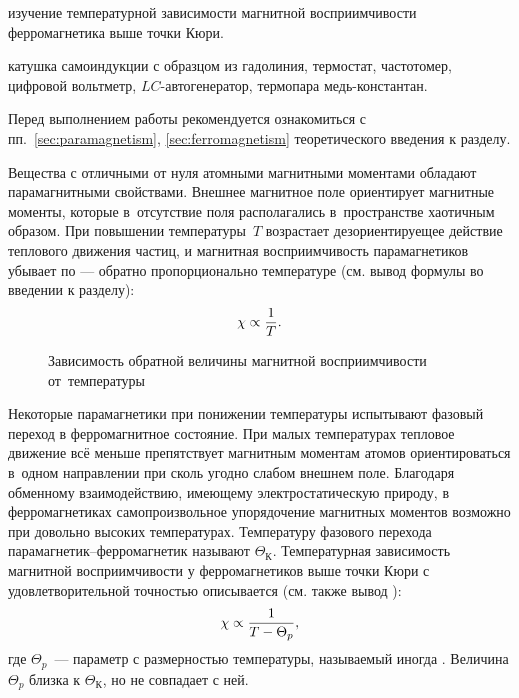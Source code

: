 
\begin{lab:aim}
изучение температурной зависимости магнитной восприимчивости ферромагнетика
выше точки Кюри.
\end{lab:aim}

\begin{lab:equipment}
катушка самоиндукции с образцом из гадолиния, термостат, частотомер,
цифровой вольтметр, $LC$-автогенератор, термопара медь-константан.
\end{lab:equipment}

Перед выполнением работы рекомендуется ознакомиться с
пп.~\ref{sec:paramagnetism}, \ref{sec:ferromagnetism} теоретического
введения к разделу.

Вещества с отличными от нуля атомными магнитными моментами обладают
парамагнитными свойствами. Внешнее магнитное поле ориентирует магнитные моменты,
которые в~отсутствие поля располагались в~пространстве хаотичным образом.
При повышении температуры~$T$ возрастает дезориентируещее действие теплового
движения частиц, и магнитная восприимчивость парамагнетиков убывает
по  --- обратно пропорционально температуре (см.
вывод формулы  во введении к разделу):
\begin{equation}%
	\chi\propto \frac{1}{T}.
	\eqmark{curi}
\end{equation}

\begin{wrapfigure}{r}{0.4\textwidth}
    \caption{Зависимость обратной величины магнитной восприимчивости
от~температуры}
\end{wrapfigure}

Некоторые парамагнетики при понижении температуры испытывают
фазовый переход в ферромагнитное состояние. При малых температурах
тепловое движение всё меньше препятствует магнитным моментам атомов
ориентироваться в~одном направлении при сколь угодно слабом внешнем поле.
Благодаря обменному взаимодействию, имеющему электростатическую природу,
в ферромагнетиках самопроизвольное упорядочение магнитных моментов
возможно при довольно высоких температурах. Температуру фазового перехода
парамагнетик--ферромагнетик называют  $\Theta_К$.
Температурная зависимость магнитной восприимчивости у ферромагнетиков
выше точки Кюри с удовлетворительной точностью
описывается  (см. также вывод
):
\begin{equation}%
    \chi\propto \frac{1}{T-\Theta_p},
    \eqmark{curi-veis}
\end{equation}
где $\Theta_p$~--- параметр с размерностью температуры, называемый
иногда . Величина $\Theta_p$ близка к
$\Theta_К$, но не совпадает с ней.

